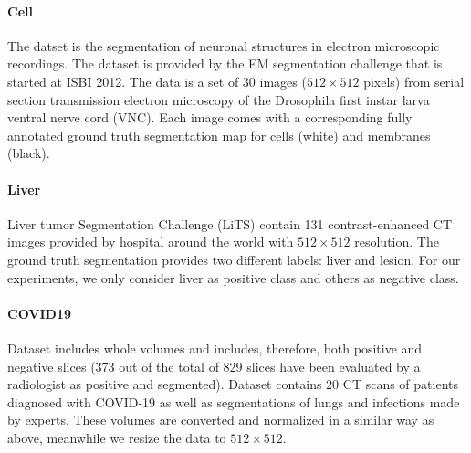 \documentclass{ieeeaccess}
\begin{document}
\paragraph{Cell}
The datset is the segmentation of neuronal structures in electron microscopic recordings.
The dataset is provided by the EM segmentation challenge\cite{isbicell} that is started at ISBI 2012.
The data is a set of 30 images ($512\times 512$ pixels) from serial section transmission electron
microscopy of the Drosophila first instar larva ventral nerve cord (VNC). Each image comes with a corresponding fully annotated ground truth segmentation
map for cells (white) and membranes (black).

\paragraph{Liver}
Liver tumor Segmentation Challenge (LiTS)\cite{liver} contain 131 contrast-enhanced CT images provided by hospital around the world with \(512 \times 512\) resolution.
The ground truth segmentation provides two different labels: liver and lesion. For our experiments,
we only consider liver as positive class and others as negative class.


\paragraph{COVID19}
Dataset\cite{covid19} includes whole volumes and includes, therefore, both positive and negative slices 
(373 out of the total of 829 slices have been evaluated by a radiologist as positive and segmented). 
Dataset\cite{covid19_2} contains 20 CT scans of patients diagnosed with COVID-19 as well as segmentations of lungs and infections made by experts.
These volumes are converted and normalized in a similar way as above, meanwhile we resize the data to $512\times 512$.
\end{document}
